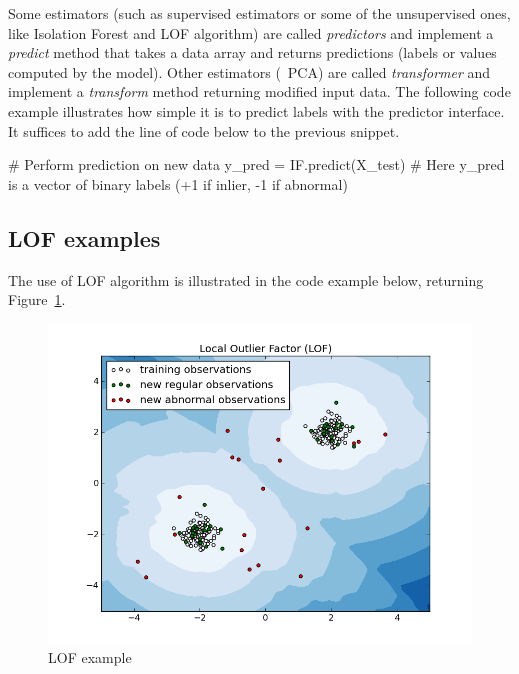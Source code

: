 Some estimators (such as supervised estimators or some of the unsupervised ones, like Isolation Forest and LOF algorithm) are called \emph{predictors} and implement a \emph{predict} method that takes a data array and returns predictions (labels or values computed by the model). Other estimators (\eg~PCA) are called \emph{transformer} and implement a \emph{transform} method returning modified input data.
The following code example illustrates how simple it is to predict labels with the predictor interface. It suffices to add the line of code below to the previous snippet.

\begin{pythoncode} 
# Perform prediction on new data
y_pred = IF.predict(X_test)  
# Here y_pred is a vector of binary labels (+1 if inlier, -1 if abnormal)
\end{pythoncode}



\subsection{LOF examples}
The use of LOF algorithm is illustrated in the code example below, returning Figure~\ref{fig:lof}.
\begin{figure}[!ht]
  \includegraphics[width=0.9\linewidth]{fig_source/lof}
  \caption{LOF example}
  \label{fig:lof}
\end{figure}

